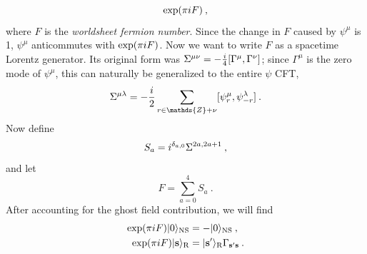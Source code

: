 	\begin{equation}
		\exp(\pi i F) \:, \label{10.2.19}
	\end{equation}
	where $F$ is the \emph{worldsheet fermion number}. Since the change in $F$ caused by $\psi^{\mu}$ is 1, $\psi^{\mu}$ anticommutes with $\exp(\pi i F)$. Now we want to write $F$ as a spacetime Lorentz generator. Its original form was $\Sigma^{\mu\nu}=-\frac{i}{4}[\Gamma^{\mu},\Gamma^{\nu}]$; since $\Gamma^{\mu}$ is the zero mode of $\psi^{\mu}$, this can naturally be generalized to the entire $\psi$ CFT,
	\begin{equation}
		\Sigma^{\mu\lambda}=
		-\frac{\mi}{2}\sum_{r\in\mathds{Z}+\nu}[\psi_{r}^{\mu},\psi_{-r}^{\lambda}]\:. \label{10.2.20}
	\end{equation}
	Now define
	\begin{equation}
		S_{a}=i^{\delta_{a,0}}\Sigma^{2a,2a+1} \:, \label{102.21}
	\end{equation}
	and let
	\begin{equation}
		F=\sum_{a=0}^{4}S_{a}\:. \label{10.2.22}
	\end{equation}
	After accounting for the ghost field contribution, we will find
	\begin{subequations}
		\begin{align}
			\exp(\pi i F)\lvert 0\rangle_{\text{NS}}& =-\lvert 0\rangle_{\text{NS}}\:, \label{10.2.24a} \\
			\exp(\pi i F)\lvert \mathbf{s}\rangle_{\text{R}}&=\lvert\mathbf{s}^{\prime}\rangle_{\text{R}}\Gamma_{\mathbf{s}^{\prime}\mathbf{s}}\:. \label{10.2.24b}
		\end{align} \label{10.2.24}
	\end{subequations}
